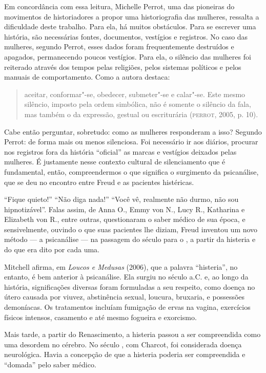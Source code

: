 Em concordância com essa leitura, Michelle Perrot, uma das pioneiras do
movimentos de historiadores a propor uma historiografia das mulheres,
ressalta a dificuldade deste trabalho. Para ela, há muitos obstáculos.
Para se escrever uma história, são necessárias fontes, documentos,
vestígios e registros. No caso das mulheres, segundo Perrot, esses dados
foram frequentemente destruídos e apagados, permanecendo poucos
vestígios. Para ela, o silêncio das mulheres foi reiterado através dos
tempos pelas religiões, pelos sistemas políticos e pelos manuais de
comportamento. Como a autora destaca:

\begin{quote}
aceitar, conformar"-se, obedecer, submeter"-se e calar"-se. Este mesmo
silêncio, imposto pela ordem simbólica, não é somente o silêncio da
fala, mas também o da expressão, gestual ou escriturária (\textsc{perrot}, 2005, p. 10).
\end{quote}

Cabe então perguntar, sobretudo: como as mulheres responderam a isso?
Segundo Perrot: de forma mais ou menos silenciosa. Foi necessário ir aos
diários, procurar nos registros fora da história ``oficial'' as marcas e
vestígios deixados pelas mulheres. É justamente nesse contexto cultural
de silenciamento que é fundamental, então, compreendermos o que
significa o surgimento da psicanálise, que se deu no encontro entre
Freud e as pacientes histéricas.

``Fique quieto!'' ``Não diga nada!'' ``Você vê, realmente não durmo, não
sou hipnotizável''. Falas assim, de Anna O., Emmy von N., Lucy R.,
Katharina e Elizabeth von R., entre outras, questionaram o saber médico
de sua época, e sensivelmente, ouvindo o que suas pacientes lhe diziam,
Freud inventou um novo método --- a psicanálise --- na passagem do século
 para o , a partir da histeria e do que era dito por cada uma.

Mitchell afirma, em \emph{Loucos e Medusas} (2006), que a palavra
``histeria'', no entanto, é bem anterior à psicanálise. Ela surgiu no
século  a.C. e, ao longo da história, significações diversas foram
formuladas a seu respeito, como doença no útero causada por viuvez,
abstinência sexual, loucura, bruxaria, e possessões demoníacas. Os
tratamentos incluíam fumigação de ervas na vagina, exercícios físicos
intensos, casamento e até mesmo fogueira e exorcismo.

Mais tarde, a partir do Renascimento, a histeria passou a ser
compreendida como uma desordem no cérebro. No século , com Charcot,
foi considerada doença neurológica. Havia a concepção de que a histeria
poderia ser compreendida e ``domada'' pelo saber médico.

